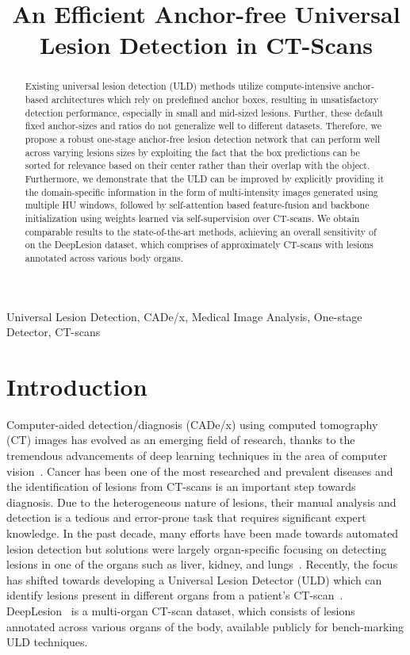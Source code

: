\documentclass{article}
\title{An Efficient Anchor-free Universal Lesion Detection in CT-Scans}
\begin{document}
\maketitle
\begin{abstract}
Existing universal lesion detection (ULD) methods utilize compute-intensive anchor-based architectures which rely on predefined anchor boxes, resulting in unsatisfactory detection performance, especially in small and mid-sized lesions. Further, these default fixed anchor-sizes and ratios do not generalize well to different datasets. Therefore, we propose a robust one-stage anchor-free lesion detection network that can perform well across varying lesions sizes by exploiting the fact that the box predictions can be sorted for relevance based on their center rather than their overlap with the object. Furthermore, we demonstrate that the ULD can be improved by explicitly providing it the domain-specific information in the form of multi-intensity images generated using multiple HU windows, followed by self-attention based feature-fusion and backbone initialization using weights learned via self-supervision over CT-scans. We obtain comparable results to the state-of-the-art methods, achieving an overall sensitivity of  on the DeepLesion dataset, which comprises of approximately  CT-scans with lesions annotated across various body organs. 


\end{abstract}
\begin{keywords}
Universal Lesion Detection, CADe/x, Medical Image Analysis, One-stage Detector, CT-scans
\end{keywords}
\section{Introduction}
\label{sec:intro}
Computer-aided detection/diagnosis (CADe/x) using computed tomography (CT) images has evolved as an emerging field of research, thanks to the tremendous advancements of deep learning techniques in the area of computer vision~\cite{litjens2017survey, kidney, pulm_nodule}.
Cancer has been one of the most researched and prevalent diseases and the identification of lesions from CT-scans is an important step towards diagnosis. Due to the heterogeneous nature of lesions, their manual analysis and detection is a tedious and error-prone task that requires significant expert knowledge. In the past decade, many efforts have been made towards automated lesion detection but solutions were largely organ-specific focusing on detecting lesions in one of the organs such as liver, kidney, and lungs~\cite{kidney, pulm_nodule}. Recently, the focus has shifted towards developing a Universal Lesion Detector (ULD) which can identify lesions present in different organs from a patient's CT-scan~\cite{yan2019mulan, li2019mvp, 3dce, mla-net, anchorfree-rpn}. DeepLesion~\cite{yan2018deeplesion} is a multi-organ CT-scan dataset, which consists of  lesions annotated across various organs of the body, available publicly for bench-marking ULD techniques.
\end{document}
